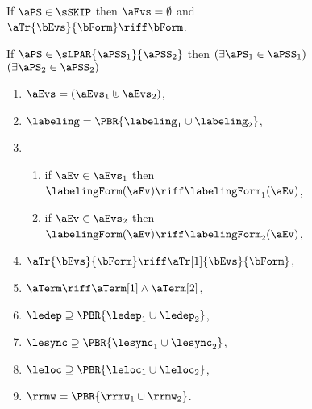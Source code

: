 \begin{figure}
  \raggedright
  \noindent
  If $\aPS\in\sSKIP$ then $\aEvs = \emptyset$ and
  $\aTr{\bEvs}{\bForm} \riff \bForm$.
  \medskip

  \noindent
  If $\aPS \in \sLPAR{\aPSS_1}{\aPSS_2}$ then  
  $(\exists\aPS_1\in\aPSS_1)$ $(\exists\aPS_2\in\aPSS_2)$
  \begin{multicols}{2}
    \begin{enumerate}[topsep=0pt,label=(\textsc{p}\arabic*),ref=\textsc{p}\arabic*]
    \item \label{par-E}
      $\aEvs = (\aEvs_1\uplus\aEvs_2)$,
    \item \label{par-lambda}
      ${\labeling}=\PBR{{\labeling_1}\cup {\labeling_2}}$, 
    \item[] \setcounter{enumi}{\value{kappa}} 
      \begin{enumerate}[leftmargin=0pt]
      \item \label{par-kappa1} if $\aEv\in\aEvs_1$ then $\labelingForm(\aEv) \riff \labelingForm_1(\aEv)$,
      \item \label{par-kappa2} if $\aEv\in\aEvs_2$ then $\labelingForm(\aEv) \riff \labelingForm_2(\aEv)$,
      \end{enumerate}
    \item \label{par-tau}
      $\aTr{\bEvs}{\bForm} \riff \aTr[1]{\bEvs}{\bForm}$,
    \item \label{par-term}
      $\aTerm \riff \aTerm[1]\land\aTerm[2]$,
    \item \label{par-ledep}
      ${\ledep}\supseteq\PBR{{\ledep_1}\cup{\ledep_2}}$, 
    \item \label{par-lesync}
      ${\lesync}\supseteq\PBR{{\lesync_1}\cup{\lesync_2}}$, 
    \item \label{par-leloc}
      ${\leloc}\supseteq\PBR{{\leloc_1}\cup{\leloc_2}}$, 
    \item \label{par-rmw}
      ${\rrmw}=\PBR{{\rrmw_1}\cup{\rrmw_2}}$.
    \end{enumerate}    
  \end{multicols}
  \medskip


\end{figure}
